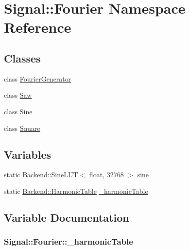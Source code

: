 \hypertarget{namespaceSignal_1_1Fourier}{\section{Signal\+:\+:Fourier Namespace Reference}
\label{namespaceSignal_1_1Fourier}
}
\subsection*{Classes}
\begin{DoxyCompactItemize}
\item 
class \hyperlink{classSignal_1_1Fourier_1_1FourierGenerator}{Fourier\+Generator}
\item 
class \hyperlink{classSignal_1_1Fourier_1_1Saw}{Saw}
\item 
class \hyperlink{classSignal_1_1Fourier_1_1Sine}{Sine}
\item 
class \hyperlink{classSignal_1_1Fourier_1_1Square}{Square}
\end{DoxyCompactItemize}
\subsection*{Variables}
\begin{DoxyCompactItemize}
\item 
static \hyperlink{classBackend_1_1SineLUT}{Backend\+::\+Sine\+L\+U\+T}$<$ float, 32768 $>$ \hyperlink{namespaceSignal_1_1Fourier_ab1bf3cdef768a49cf3e927b9daf7da9d}{sine}
\item 
static \hyperlink{classBackend_1_1HarmonicTable}{Backend\+::\+Harmonic\+Table} \hyperlink{namespaceSignal_1_1Fourier_a7b4ca1fc91cf3d4454c7a7084c2c2462}{\+\_\+harmonic\+Table}
\end{DoxyCompactItemize}


\subsection{Variable Documentation}
\hypertarget{namespaceSignal_1_1Fourier_a7b4ca1fc91cf3d4454c7a7084c2c2462}{
\subsubsection[{\+\_\+harmonic\+Table}]{ Signal\+::\+Fourier\+::\+\_\+harmonic\+Table\hspace{0.3cm}{\ttfamily [static]}}}\label{namespaceSignal_1_1Fourier_a7b4ca1fc91cf3d4454c7a7084c2c2462}


